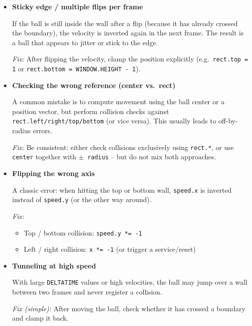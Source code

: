\begin{warningbox}

\begin{itemize}
	\item \textbf{Sticky edge / multiple flips per frame}  
	
	If the ball is still inside the wall after a flip (because it has already crossed the boundary), the velocity is inverted again in the next frame.  
	The result is a ball that appears to jitter or stick to the edge.
	
	\emph{Fix:}  
	After flipping the velocity, clamp the position explicitly (e.g.\ \texttt{rect.top = 1} or \texttt{rect.bottom = WINDOW.HEIGHT - 1}).
	
	\item \textbf{Checking the wrong reference (center vs.\ rect)}  
	
	A common mistake is to compute movement using the ball center or a position vector, but perform collision checks against \texttt{rect.left/right/top/bottom} (or vice versa). This usually leads to off-by-radius errors.
	
	\emph{Fix:}  
	Be consistent: either check collisions exclusively using \texttt{rect.*},  
	or use \texttt{center} together with \texttt{$\pm$ radius} -- but do not mix both approaches.
	
	\item \textbf{Flipping the wrong axis}  
	
	A classic error: when hitting the top or bottom wall, \texttt{speed.x} is inverted instead of \texttt{speed.y} (or the other way around).
	
	\emph{Fix:}
	\begin{itemize}
		\item Top / bottom collision: \texttt{speed.y *= -1}
		\item Left / right collision: \texttt{x *= -1} (or trigger a service/reset)
	\end{itemize}
	
	\item \textbf{Tunneling at high speed}  
	
	With large \texttt{DELTATIME} values or high velocities, the ball may jump over a wall between two frames and never register a collision.
	
	\emph{Fix (simple):}  
	After moving the ball, check whether it has crossed a boundary and clamp it back.
	

\end{itemize}
\end{warningbox}
